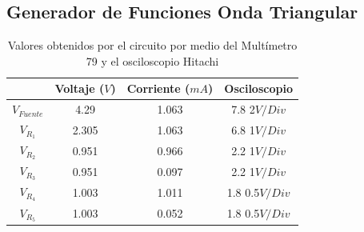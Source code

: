 \documentclass[twocolumn]{IEEEtran}
\begin{document}
\subsection{Generador de Funciones Onda Triangular}
\noindent
\begin{table}[H]
	\centering
\begin{tabular}[c]{|c|c|c|c|} \hline
 & Voltaje ($V$) & Corriente ($mA$) & Osciloscopio \\ \hline
$V_{Fuente}$ & 4.29 & 1.063 & 7.8 2$V/Div$ \\ \hline
$V_{R_{1}}$ & 2.305 & 1.063 & 6.8 1$V/Div$ \\ \hline
$V_{R_{2}}$ & 0.951 & 0.966 & 2.2 1$V/Div$ \\ \hline
$V_{R_{3}}$ & 0.951 & 0.097 & 2.2 1$V/Div$ \\ \hline
$V_{R_{4}}$ & 1.003 & 1.011 & 1.8 0.5$V/Div$ \\ \hline
$V_{R_{5}}$ & 1.003 & 0.052 & 1.8 0.5$V/Div$ \\ \hline
\end{tabular}
	\caption{Valores obtenidos por el circuito por medio del Multímetro 79 y
el osciloscopio Hitachi}
	\label{tab8}
\end{table}
\end{document}
